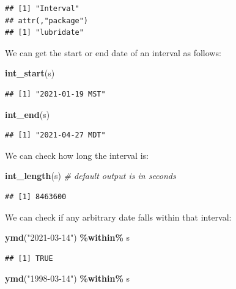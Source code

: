 \documentclass[
]{book}
\newenvironment{Shaded}{\begin{snugshade}}{\end{snugshade}}
\newcommand{\CommentTok}[1]{\textcolor[rgb]{0.56,0.35,0.01}{\textit{#1}}}
\newcommand{\FunctionTok}[1]{\textcolor[rgb]{0.13,0.29,0.53}{\textbf{#1}}}
\newcommand{\NormalTok}[1]{#1}
\newcommand{\SpecialCharTok}[1]{\textcolor[rgb]{0.81,0.36,0.00}{\textbf{#1}}}
\newcommand{\StringTok}[1]{\textcolor[rgb]{0.31,0.60,0.02}{#1}}
\begin{document}
\begin{verbatim}
## [1] "Interval"
## attr(,"package")
## [1] "lubridate"
\end{verbatim}

We can get the start or end date of an interval as follows:

\begin{Shaded}
\begin{Highlighting}[]
\FunctionTok{int\_start}\NormalTok{(s)}
\end{Highlighting}
\end{Shaded}

\begin{verbatim}
## [1] "2021-01-19 MST"
\end{verbatim}

\begin{Shaded}
\begin{Highlighting}[]
\FunctionTok{int\_end}\NormalTok{(s)}
\end{Highlighting}
\end{Shaded}

\begin{verbatim}
## [1] "2021-04-27 MDT"
\end{verbatim}

We can check how long the interval is:

\begin{Shaded}
\begin{Highlighting}[]
\FunctionTok{int\_length}\NormalTok{(s) }\CommentTok{\# default output is in seconds}
\end{Highlighting}
\end{Shaded}

\begin{verbatim}
## [1] 8463600
\end{verbatim}

We can check if any arbitrary date falls within that interval:

\begin{Shaded}
\begin{Highlighting}[]
\FunctionTok{ymd}\NormalTok{(}\StringTok{"2021{-}03{-}14"}\NormalTok{) }\SpecialCharTok{\%within\%}\NormalTok{ s}
\end{Highlighting}
\end{Shaded}

\begin{verbatim}
## [1] TRUE
\end{verbatim}

\begin{Shaded}
\begin{Highlighting}[]
\FunctionTok{ymd}\NormalTok{(}\StringTok{"1998{-}03{-}14"}\NormalTok{) }\SpecialCharTok{\%within\%}\NormalTok{ s}
\end{Highlighting}
\end{Shaded}
\end{document}
